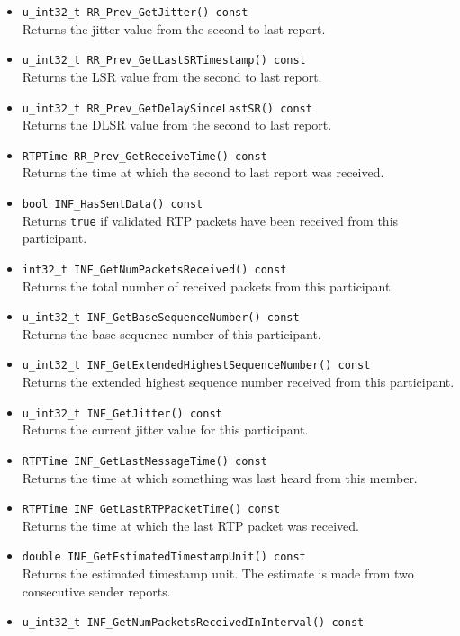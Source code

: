 \documentclass[12pt,a4paper]{article}
\begin{document}
\begin{itemize}
					\item {\tt u\_int32\_t RR\_Prev\_GetJitter() const}\\
						Returns the jitter value from the second to last report.
					\item {\tt u\_int32\_t RR\_Prev\_GetLastSRTimestamp() const}\\
						Returns the LSR value from the second to last report.
					\item {\tt u\_int32\_t RR\_Prev\_GetDelaySinceLastSR() const}\\
						Returns the DLSR value from the second to last report.
					\item {\tt RTPTime RR\_Prev\_GetReceiveTime() const}\\
						Returns the time at which the second to last report was received.
					\item {\tt bool INF\_HasSentData() const}\\
						Returns {\tt true} if validated RTP packets have been received from this
						participant.
					\item {\tt int32\_t INF\_GetNumPacketsReceived() const}\\
						Returns the total number of received packets from this participant.
					\item {\tt u\_int32\_t INF\_GetBaseSequenceNumber() const}\\
						Returns the base sequence number of this participant.
					\item {\tt u\_int32\_t INF\_GetExtendedHighestSequenceNumber() const}\\
						Returns the extended highest sequence number received from this
						participant.
					\item {\tt u\_int32\_t INF\_GetJitter() const}\\
						Returns the current jitter value for this participant.
					\item {\tt RTPTime INF\_GetLastMessageTime() const}\\
						Returns the time at which something was last heard from this member.
					\item {\tt RTPTime INF\_GetLastRTPPacketTime() const}\\
						Returns the time at which the last RTP packet was received.
					\item {\tt double INF\_GetEstimatedTimestampUnit() const}\\
						Returns the estimated timestamp unit. The estimate is made from two
						consecutive sender reports.
					\item {\tt u\_int32\_t INF\_GetNumPacketsReceivedInInterval() const}\\

\end{itemize}
\end{document}

